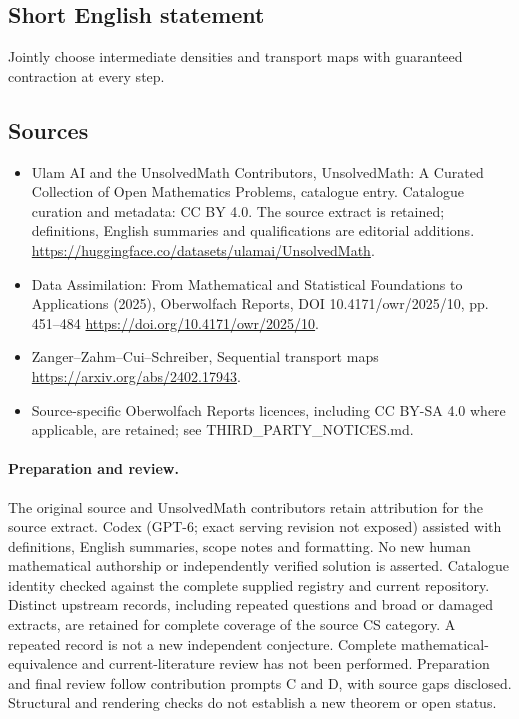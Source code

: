 \documentclass[11pt]{article}
\begin{document}
\subsection{Short English statement}
Jointly choose intermediate densities and transport maps with guaranteed contraction at every step.
\subsection{Sources}
\begin{itemize}
\item[\hypertarget{source:statement:1}{S1}] Ulam AI and the UnsolvedMath Contributors, UnsolvedMath: A Curated Collection of Open Mathematics Problems, catalogue entry. Catalogue curation and metadata: CC BY 4.0. The source extract is retained; definitions, English summaries and qualifications are editorial additions.
\url{https://huggingface.co/datasets/ulamai/UnsolvedMath}.
\item[\hypertarget{source:statement:2}{S2}] Data Assimilation: From Mathematical and Statistical Foundations to Applications (2025), Oberwolfach Reports, DOI 10.4171/owr/2025/10, pp. 451--484
\url{https://doi.org/10.4171/owr/2025/10}.
\item[\hypertarget{source:statement:3}{S3}] Zanger--Zahm--Cui--Schreiber, Sequential transport maps
\url{https://arxiv.org/abs/2402.17943}.
\item Source-specific Oberwolfach Reports licences, including CC BY-SA 4.0 where applicable, are retained; see THIRD\_PARTY\_NOTICES.md.
\end{itemize}
\paragraph{Preparation and review.}
The original source and UnsolvedMath contributors retain attribution for the source extract. Codex (GPT-6; exact serving revision not exposed) assisted with definitions, English summaries, scope notes and formatting. No new human mathematical authorship or independently verified solution is asserted. Catalogue identity checked against the complete supplied registry and current repository. Distinct upstream records, including repeated questions and broad or damaged extracts, are retained for complete coverage of the source CS category. A repeated record is not a new independent conjecture. Complete mathematical-equivalence and current-literature review has not been performed. Preparation and final review follow contribution prompts C and D, with source gaps disclosed. Structural and rendering checks do not establish a new theorem or open status.
\label{end:statement}
\end{document}
